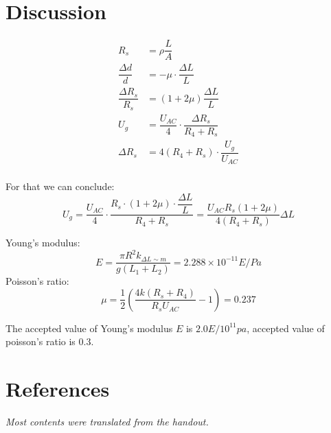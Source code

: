 \documentclass[a4paper]{article}
\begin{document}
\begin{multicols*}{2}
    \section*{Discussion}
    \begin{equation}
        \begin{aligned}
            R_s &=\rho \dfrac{L}{A}\\
            \dfrac{\Delta d}{d} &= -\mu\cdot\dfrac{\Delta L}{L}\\
            \dfrac{\Delta R_s}{R_s} &= (1+2\mu)\dfrac{\Delta L}{L}\\
            U_g &= \dfrac{U_{AC}}{4}\cdot\dfrac{\Delta R_s}{R_4 + R_s}\\
            \Delta R_s &= 4(R_4 + R_s)\cdot\dfrac{U_g}{U_{AC}}\\
        \end{aligned}
    \end{equation}

    For that we can conclude:
    \begin{equation}
        U_g = \dfrac{U_{AC}}{4}\cdot\dfrac{R_s\cdot(1+2\mu)\cdot\dfrac{\Delta L}{L}}{R_4 + R_s} = \dfrac{U_{AC}R_s(1+2\mu)}{4(R_4 + R_s)}\Delta L
    \end{equation}

    Young's modulus:
    \begin{equation}
        E = \dfrac{\pi R^2 k_{\Delta L \sim m}}{g(L_1 + L_2)} = 2.288\times 10^{-11} E/Pa
    \end{equation}
    Poisson's ratio:
    \begin{equation}
        \mu = \frac 12 (\dfrac{4k(R_s + R_4)}{R_s U_{AC}} - 1) = 0.237
    \end{equation}

    The accepted value of Young's modulus $E$ is $2.0E/10^{11}pa$, accepted value of poisson's ratio is $0.3$.
    \section*{References}
    \textit{Most contents were translated from the handout.}
    \newpage
\end{multicols*}
\end{document}
